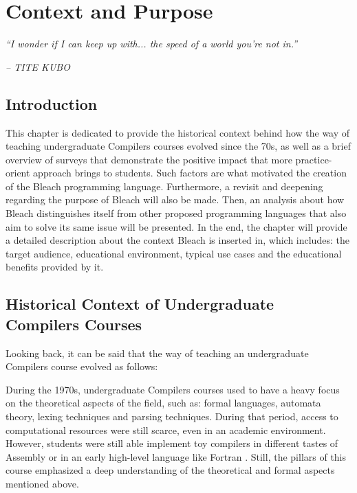 \chapter{Context and Purpose} \label{cap:metodologia}

\begin{displayquote}
    \begin{center}
        \textit{``I wonder if I can keep up with... the speed of a world you're not in.''}
    \end{center}
\end{displayquote}

\begin{flushright}
   \textit{-- TITE KUBO}
\end{flushright}

\section{Introduction}
This chapter is dedicated to provide the historical context behind how the way of teaching undergraduate Compilers courses evolved since the 70s, as well as a brief overview of surveys that demonstrate the positive impact that more practice-orient approach brings to students. Such factors are what motivated the creation of the Bleach programming language. Furthermore, a revisit and deepening regarding the purpose of Bleach will also be made. Then, an analysis about how Bleach distinguishes itself from other proposed programming languages that also aim to solve its same issue will be presented. In the end, the chapter will provide a detailed description about the context Bleach is inserted in, which includes: the target audience, educational environment, typical use cases and the educational benefits provided by it.

\section{Historical Context of Undergraduate Compilers \newline Courses}
Looking back, it can be said that the way of teaching an undergraduate Compilers course evolved as follows:

During the 1970s, undergraduate Compilers courses used to have a heavy focus on the theoretical aspects of the field, such as: formal languages, automata theory, lexing techniques and parsing techniques. During that period, access to computational resources were still scarce, even in an academic environment. However, students were still able implement toy compilers in different tastes of Assembly or in an early high-level language like Fortran \cite{fortran_official_website}. Still, the pillars of this course emphasized a deep understanding of the theoretical and formal aspects mentioned above.

